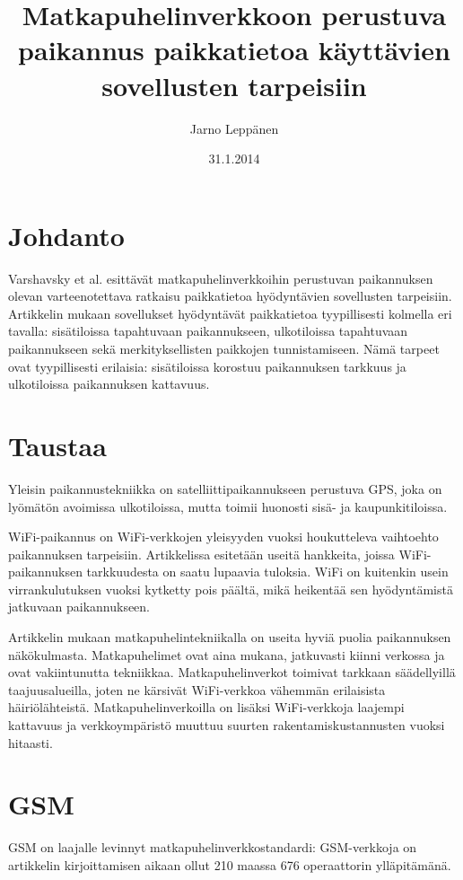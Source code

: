 \documentclass[a4paper]{scrartcl}
\author{Jarno Leppänen}
\title{Matkapuhelinverkkoon perustuva paikannus 
paikkatietoa käyttävien sovellusten tarpeisiin}
\date{31.1.2014}
\begin{document}
\maketitle

\section{Johdanto}

Varshavsky et al.\cite{Varshavsky06aregsm} esittävät matkapuhelinverkkoihin
perustuvan paikannuksen olevan varteenotettava ratkaisu paikkatietoa
hyödyntävien sovellusten tarpeisiin. Artikkelin mukaan sovellukset hyödyntävät paikkatietoa tyypillisesti kolmella
eri tavalla: sisätiloissa tapahtuvaan paikannukseen, ulkotiloissa tapahtuvaan
paikannukseen sekä merkityksellisten paikkojen tunnistamiseen. Nämä tarpeet 
ovat tyypillisesti erilaisia: sisätiloissa
korostuu paikannuksen tarkkuus ja ulkotiloissa paikannuksen kattavuus.

\section{Taustaa}

Yleisin paikannustekniikka on satelliittipaikannukseen perustuva GPS, joka
on lyömätön avoimissa ulkotiloissa, mutta toimii huonosti sisä- ja kaupunkitiloissa.

WiFi-paikannus on WiFi-verkkojen yleisyyden vuoksi houkutteleva vaihtoehto
paikannuksen tarpeisiin. Artikkelissa esitetään useitä hankkeita, joissa
WiFi-paikannuksen tarkkuudesta on saatu lupaavia tuloksia. WiFi on kuitenkin
usein virrankulutuksen vuoksi kytketty pois päältä, mikä heikentää sen hyödyntämistä
jatkuvaan paikannukseen.

Artikkelin mukaan matkapuhelintekniikalla on useita hyviä puolia paikannuksen
näkökulmasta. Matkapuhelimet ovat aina mukana, jatkuvasti kiinni verkossa ja ovat vakiintunutta tekniikkaa. Matkapuhelinverkot toimivat tarkkaan säädellyillä taajuusalueilla, joten
ne kärsivät WiFi-verkkoa vähemmän erilaisista häiriölähteistä. Matkapuhelinverkoilla on lisäksi WiFi-verkkoja laajempi kattavuus ja verkkoympäristö muuttuu suurten rakentamiskustannusten vuoksi hitaasti.
	  
\section{GSM}
GSM on laajalle levinnyt matkapuhelinverkkostandardi: GSM-verkkoja on artikkelin kirjoittamisen aikaan ollut 210 maassa 676 operaattorin ylläpitämänä.
\end{document}
